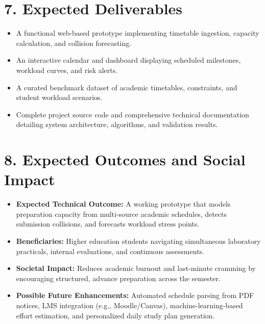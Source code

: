 \documentclass[11pt,a4paper]{article}
\begin{document}

\section*{7. Expected Deliverables}

\begin{itemize}

\item A functional web-based prototype implementing timetable ingestion, capacity calculation, and collision forecasting.

\item An interactive calendar and dashboard displaying scheduled milestones, workload curves, and risk alerts.

\item A curated benchmark dataset of academic timetables, constraints, and student workload scenarios.

\item Complete project source code and comprehensive technical documentation detailing system architecture, algorithms, and validation results.

\end{itemize}



\section*{8. Expected Outcomes and Social Impact}

\begin{itemize}

\item \textbf{Expected Technical Outcome:}
A working prototype that models preparation capacity from multi-source academic schedules, detects submission collisions, and forecasts workload stress points.

\item \textbf{Beneficiaries:}
Higher education students navigating simultaneous laboratory practicals, internal evaluations, and continuous assessments.

\item \textbf{Societal Impact:}
Reduces academic burnout and last-minute cramming by encouraging structured, advance preparation across the semester.

\item \textbf{Possible Future Enhancements:}
Automated schedule parsing from PDF notices, LMS integration (e.g., Moodle/Canvas), machine-learning-based effort estimation, and personalized daily study plan generation.

\end{itemize}
\end{document}
